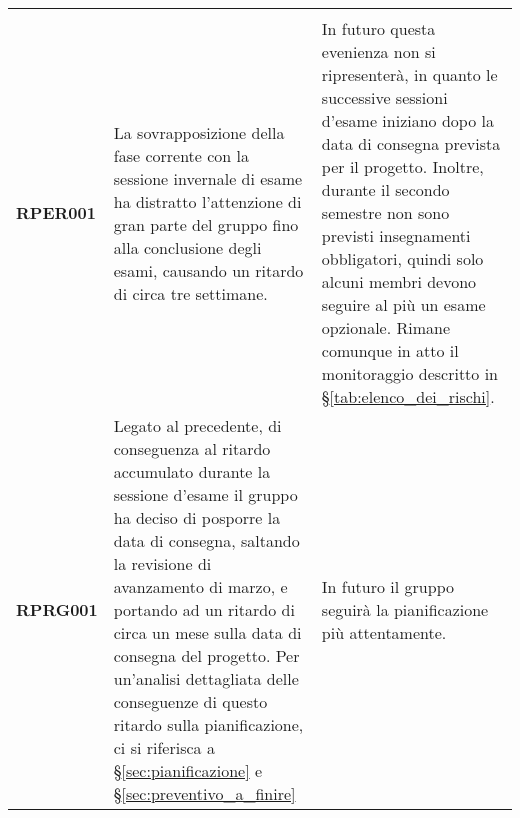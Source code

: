 \documentclass[../piano-di-progetto]{subfiles}
\begin{document}
\begin{longtable}[H]{|p{10em}|p{17em}|p{17em}|}
  \rowcolor{darkgray!90!}
  \color{white}{\textbf{Rischio}} & \color{white}{\textbf{Gestione}}                                                                                                                                                                                                                                                                                                                                                                                                            & \color{white}{\textbf{Monitoraggio}}                                                                                                                                                                                                                                                                                                                                                         \\
  \textbf{RPER001}                & La sovrapposizione della fase corrente con la sessione invernale di esame ha distratto l'attenzione di gran parte del gruppo fino alla conclusione degli esami, causando un ritardo di circa tre settimane.                                                                                                                                                                                                                                 & In futuro questa evenienza non si ripresenterà, in quanto le successive sessioni d'esame iniziano dopo la data di consegna prevista per il progetto. Inoltre, durante il secondo semestre non sono previsti insegnamenti obbligatori, quindi solo alcuni membri devono seguire al più un esame opzionale. Rimane comunque in atto il monitoraggio descritto in §\ref{tab:elenco_dei_rischi}. \\
  \textbf{RPRG001}                & Legato al precedente, di conseguenza al ritardo accumulato durante la sessione d'esame il gruppo ha deciso di posporre la data di consegna, saltando la revisione di avanzamento di marzo, e portando ad un ritardo di circa un mese sulla data di consegna del progetto. Per un'analisi dettagliata delle conseguenze di questo ritardo sulla pianificazione, ci si riferisca a §\ref{sec:pianificazione} e §\ref{sec:preventivo_a_finire} & In futuro il gruppo seguirà la pianificazione più attentamente.                                                                                                                                                                                                                                                                                                                             \\

\end{longtable}
\end{document}
